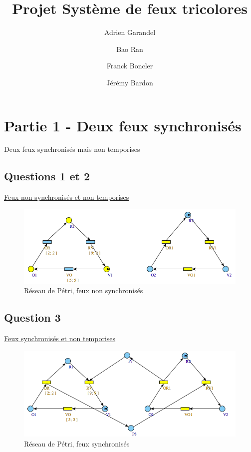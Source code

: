 \documentclass[11pt]{article}
\title{Projet Système de feux tricolores}
\author{Adrien Garandel \and Bao Ran \and Franck Boncler \and Jérémy Bardon}
\begin{document}
\maketitle
\tableofcontents
\newpage

\section{Partie 1 - Deux feux synchronisés}
Deux feux synchronisés mais non temporises

\subsection{Questions 1 et 2}

\href{https://github.com/masters-info-nantes/hong-cheng-lv/blob/master/ressources/part1/Q2-FeuxNonSynchro.xml}{Feux non synchronisés et non temporises}

\begin{figure}[H]
	\centering
	\includegraphics[width=1\textwidth]{ressources/part1/Q2.png}
	\caption{Réseau de Pétri, feux non synchronisés}
\end{figure}

\subsection{Question 3}

\href{https://github.com/masters-info-nantes/hong-cheng-lv/blob/master/ressources/part1/Q3-FeuxSynchro.xml}{Feux
synchronisés et non temporises}

\begin{figure}[H]
	\centering
	\includegraphics[width=1\textwidth]{ressources/part1/Q3.png}
	\caption{Réseau de Pétri, feux synchronisés}
\end{figure}
\end{document}
